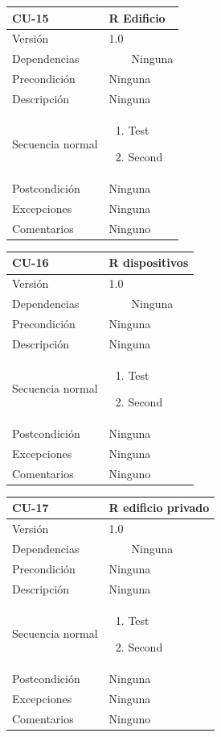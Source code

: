 \documentclass[12pt, a4paper, twoside]{article}
\newcommand{\tabitem}{~~\llap{\textbullet}~~}
\begin{document}
\begin{longtable}{ |l|l| }
  \hline
  CU-15 & R Edificio \\ \hline
  Versión & 1.0 \\ \hline
  Dependencias & 
    \tabitem Ninguna \\ \hline
  Precondición & Ninguna \\ \hline
  Descripción & Ninguna \\ \hline
  Secuencia normal & 
  \parbox{.45\textwidth}{
    \begin{enumerate}
      \item Test
      \item Second
    \end{enumerate}
  } \\ \hline
  Postcondición & Ninguna \\ \hline
  Excepciones & Ninguna \\ \hline
  Comentarios & Ninguno \\ \hline
\end{longtable}

\begin{longtable}{ |l|l| }
  \hline
  CU-16 & R dispositivos \\ \hline
  Versión & 1.0 \\ \hline
  Dependencias & 
    \tabitem Ninguna \\ \hline
  Precondición & Ninguna \\ \hline
  Descripción & Ninguna \\ \hline
  Secuencia normal & 
  \parbox{.45\textwidth}{
    \begin{enumerate}
      \item Test
      \item Second
    \end{enumerate}
  } \\ \hline
  Postcondición & Ninguna \\ \hline
  Excepciones & Ninguna \\ \hline
  Comentarios & Ninguno \\ \hline
\end{longtable}

\begin{longtable}{ |l|l| }
  \hline
  CU-17 & R edificio privado \\ \hline
  Versión & 1.0 \\ \hline
  Dependencias & 
    \tabitem Ninguna \\ \hline
  Precondición & Ninguna \\ \hline
  Descripción & Ninguna \\ \hline
  Secuencia normal & 
  \parbox{.45\textwidth}{
    \begin{enumerate}
      \item Test
      \item Second
    \end{enumerate}
  } \\ \hline
  Postcondición & Ninguna \\ \hline
  Excepciones & Ninguna \\ \hline
  Comentarios & Ninguno \\ \hline
\end{longtable}
\end{document}
